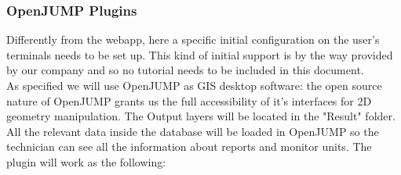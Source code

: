 \subsubsection{OpenJUMP Plugins}
Differently from the webapp, here a specific initial configuration on the user's terminals needs to be set up.
This kind of initial support is by the way provided by our company and so no tutorial needs to be included in this document. \\
As specified we will use OpenJUMP as GIS desktop software: the open source nature of OpenJUMP grants us the full accessibility of it's interfaces for 2D geometry manipulation.
The Output layers will be located in the "Result" folder. All the relevant data inside the database will be loaded in OpenJUMP so the technician can see all the information about reports and monitor units.
The plugin will work as the following:

